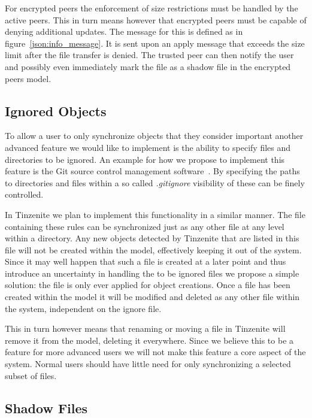 For encrypted peers the enforcement of size restrictions must be handled by the active peers.
This in turn means however that encrypted peers must be capable of denying additional updates.
The message for this is defined as in figure~\ref{json:info_message}.
It is sent upon an apply message that exceeds the size limit after the file transfer is denied.
The trusted peer can then notify the user and possibly even immediately mark the file as a shadow file in the encrypted peers model.

\subsection{Ignored Objects}
\label{sub:Ignored Objects}

To allow a user to only synchronize objects that they consider important another advanced feature we would like to implement is the ability to specify files and directories to be ignored.
An example for how we propose to implement this feature is the Git source control management software~\cite{web:site:git}.
By specifying the paths to directories and files within a so called \textit{.gitignore} visibility of these can be finely controlled.

In Tinzenite we plan to implement this functionality in a similar manner.
The file containing these rules can be synchronized just as any other file at any level within a directory.
Any new objects detected by Tinzenite that are listed in this file will not be created within the model, effectively keeping it out of the system.
Since it may well happen that such a file is created at a later point and thus introduce an uncertainty in handling the to be ignored files we propose a simple solution: the file is only ever applied for object creations.
Once a file has been created within the model it will be modified and deleted as any other file within the system, independent on the ignore file.

This in turn however means that renaming or moving a file in Tinzenite will remove it from the model, deleting it everywhere.
Since we believe this to be a feature for more advanced users we will not make this feature a core aspect of the system.
Normal users should have little need for only synchronizing a selected subset of files.

\subsection{Shadow Files}
\label{sub:Shadow Files}

